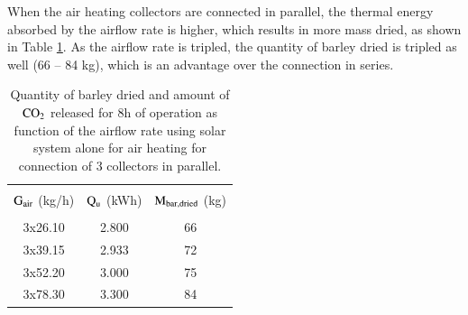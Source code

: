 When the air heating collectors are connected in parallel, the thermal energy absorbed by the airflow rate is higher, which results in more mass dried, as shown in Table \ref{gas-only-parallel}. As the airflow rate is tripled, the quantity of barley dried is tripled as well (66 -- 84 kg), which is an advantage over the connection in series.

\begin{table}[h]
	\caption{Quantity of barley dried and amount of $\rm{CO_2}$ released for 8h of operation as function of the airflow rate using solar system alone for air heating for connection of 3 collectors in parallel.}
	\centering
	
	\begin{tabular}{ccc}
		\hline \\ [-10pt]
		$\rm{G_{air}}$ (kg/h) & $\rm{Q_{u}}$ (kWh) & $\rm{M_{bar,dried}}$ (kg) \\
		\hline \\ [-10pt]
		3x26.10 & 2.800 & 66 \\ [2pt]
		3x39.15 & 2.933 & 72 \\ [2pt]
		3x52.20 & 3.000 & 75 \\ [2pt]
		3x78.30 & 3.300 & 84 \\ 
		\hline
	\end{tabular}
	
	\label{gas-only-parallel}
\end{table}


